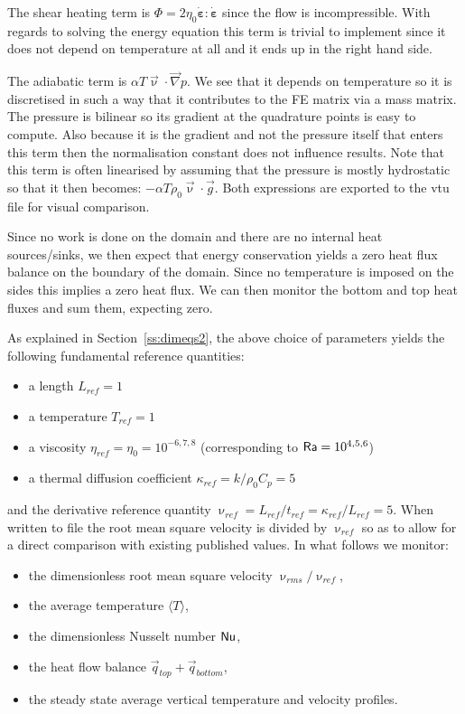 The shear heating term is $\Phi=2 \eta_0 \dot{\bm \varepsilon}:\dot{\bm \varepsilon}$ since the flow
is incompressible. With regards to solving the energy equation this term is trivial to implement 
since it does not depend on temperature at all and it ends up in the right hand side.

The adiabatic term is $\alpha T \vec{\upnu}\cdot\vec\nabla p$. 
We see that it depends on temperature so it is discretised in such a 
way that it contributes to the FE matrix via a mass matrix. 
The pressure is bilinear so its gradient at the quadrature points is easy to compute.  
Also because it is the gradient and not the pressure itself that enters this term then 
the normalisation constant does not influence results.
Note that this term is often linearised by assuming that the pressure is mostly hydrostatic
so that it then becomes: $- \alpha T \rho_0 \vec\upnu\cdot\vec{g}$.
Both expressions are exported to the vtu file for visual comparison.

Since no work is done on the domain and there are no internal heat sources/sinks, we then 
expect that energy conservation yields a zero heat flux balance on the boundary of the domain. 
Since no temperature is imposed on the sides this implies a zero heat flux. 
We can then monitor the bottom and top heat fluxes and sum them, expecting zero.  

As explained in Section~\ref{ss:dimeqs2}, the above choice of parameters yields the following 
fundamental reference quantities:
\begin{itemize}
\item a length $L_{ref}=1$ 
\item a temperature $T_{ref}=1$ 
\item a viscosity $\eta_{ref}=\eta_0=10^{-6,7,8}$ (corresponding to ${\mathsf{Ra}}=10^{4,5,6}$) 
\item a thermal diffusion coefficient $\kappa_{ref}=k/\rho_0 C_p = 5$ 
\end{itemize}
and the derivative reference quantity $\upnu_{ref} = L_{ref} / t_{ref} = \kappa_{ref}/L_{ref} = 5$.
When written to file the root mean square velocity is divided by $\upnu_{ref}$ so as to allow
for a direct comparison with existing published values.
In what follows we monitor:
\begin{itemize}
\item the dimensionless root mean square velocity $\upnu_{rms}/\upnu_{ref}$,
\item the average temperature $\langle T \rangle$,
\item the dimensionless Nusselt number ${\mathsf{Nu}}$,
\item the heat flow balance $\vec{q}_{top}+\vec{q}_{bottom}$,
\item the steady state average vertical temperature and velocity profiles.
\end{itemize}

